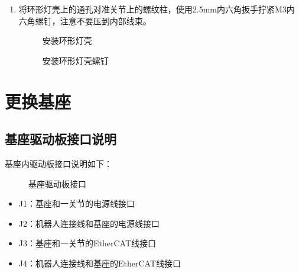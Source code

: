 \documentclass[a4paper,11pt,english,openany,oneside]{sphinxmanual}
\begin{document}
\begin{enumerate}
\item {} 
\sphinxAtStartPar
将环形灯壳上的通孔对准关节上的螺纹柱，使用2.5mm内六角扳手拧紧M3内六角螺钉，注意不要压到内部线束。

\begin{figure}[H]
\centering
\capstart

\noindent{}
\caption{安装环形灯壳}\label{\detokenize{_u66f4_u6362_u95f7_u76d6_uff0c_u73af_u5f62_u706f_u58f3:id17}}\end{figure}

\begin{figure}[H]
\centering
\capstart

\noindent{}
\caption{安装环形灯壳螺钉}\label{\detokenize{_u66f4_u6362_u95f7_u76d6_uff0c_u73af_u5f62_u706f_u58f3:id18}}\end{figure}

\end{enumerate}

\sphinxstepscope


\section{更换基座}
\label{\detokenize{_u66f4_u6362_u57fa_u5ea7:id1}}\label{\detokenize{_u66f4_u6362_u57fa_u5ea7:id2}}\label{\detokenize{_u66f4_u6362_u57fa_u5ea7::doc}}

\subsection{基座驱动板接口说明}
\label{\detokenize{_u66f4_u6362_u57fa_u5ea7:id3}}\label{\detokenize{_u66f4_u6362_u57fa_u5ea7:id4}}
\sphinxAtStartPar
基座内驱动板接口说明如下：

\begin{figure}[H]
\centering
\capstart

\noindent{}
\caption{基座驱动板接口}\label{\detokenize{_u66f4_u6362_u57fa_u5ea7:id7}}\end{figure}
\begin{itemize}
\item {} 
\sphinxAtStartPar
J1：基座和一关节的电源线接口

\item {} 
\sphinxAtStartPar
J2：机器人连接线和基座的电源线接口

\item {} 
\sphinxAtStartPar
J3：基座和一关节的EtherCAT线接口

\item {} 
\sphinxAtStartPar
J4：机器人连接线和基座的EtherCAT线接口

\end{itemize}
\end{document}
